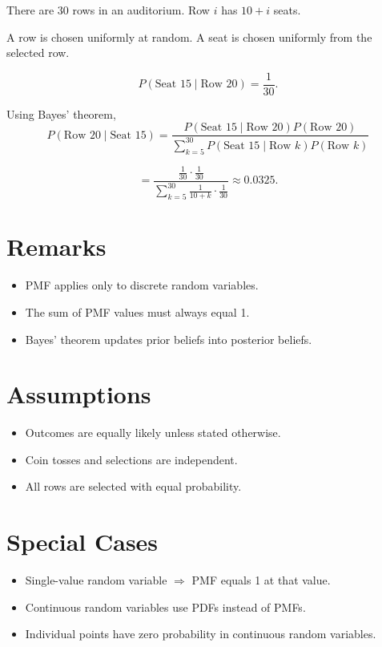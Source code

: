 \documentclass[12pt]{article}
\begin{document}
There are 30 rows in an auditorium.  
Row $i$ has $10+i$ seats.

A row is chosen uniformly at random.  
A seat is chosen uniformly from the selected row.

\[
P(\text{Seat 15} \mid \text{Row 20}) = \frac{1}{30}.
\]

Using Bayes' theorem,
\[
P(\text{Row 20} \mid \text{Seat 15}) =
\frac{P(\text{Seat 15} \mid \text{Row 20})P(\text{Row 20})}
{\sum_{k=5}^{30} P(\text{Seat 15} \mid \text{Row } k)P(\text{Row } k)}
\]

\[
=
\frac{\frac{1}{30} \cdot \frac{1}{30}}
{\sum_{k=5}^{30} \frac{1}{10+k} \cdot \frac{1}{30}}
\approx 0.0325.
\]

\section*{Remarks}

\begin{itemize}
    \item PMF applies only to discrete random variables.
    \item The sum of PMF values must always equal 1.
    \item Bayes' theorem updates prior beliefs into posterior beliefs.
\end{itemize}

\section*{Assumptions}

\begin{itemize}
    \item Outcomes are equally likely unless stated otherwise.
    \item Coin tosses and selections are independent.
    \item All rows are selected with equal probability.
\end{itemize}

\section*{Special Cases}

\begin{itemize}
    \item Single-value random variable $\Rightarrow$ PMF equals 1 at that value.
    \item Continuous random variables use PDFs instead of PMFs.
    \item Individual points have zero probability in continuous random variables.
\end{itemize}
\end{document}
